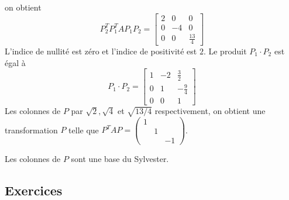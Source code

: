 \begin{example}
\begin{displaymath}
\end{displaymath}
on obtient 
\begin{displaymath}
  P_2^TP_1^T A P_1 P_2 = \left[\begin{matrix}2 & 0 & 0\\0 & -4 & 0\\0 & 0 & \frac{13}{4} \end{matrix}\right]
\end{displaymath}
L'indice de nullité est zéro et l'indice de positivité est $2$. Le produit $P_1\cdot P_2$ est égal à 
\begin{displaymath}
  P_1 \cdot P_2 = \left[\begin{matrix}1 & -2 & \frac{3}{2}\\0 & 1 & -\frac{9}{4}\\0 & 0 & 1\end{matrix}\right]
\end{displaymath}
Les colonnes de $P$ par $\sqrt{2},\sqrt{4}$ et $\sqrt{13/4}$ respectivement,  on obtient une transformation $P$ telle que $P^TAP =
\begin{pmatrix}
  1& \\
  & 1 & \\
  & & -1
\end{pmatrix}$. 
\end{example}
Les colonnes de $P$ sont une base du Sylvester. 



\subsection*{Exercices} 

